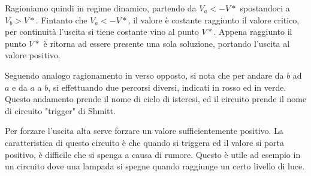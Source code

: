 \documentclass[../template]{subfiles}
\begin{document}
Ragioniamo quindi in regime dinamico, partendo da $V_a < -V*$ spostandoci a $V_b > V*$. Fintanto che $V_a < -V*$, il valore è costante raggiunto il valore critico, per continuità l'uscita si tiene costante vino al punto $V*$. Appena raggiunto il punto $V*$ è ritorna ad essere presente una sola soluzione, portando l'uscita al valore positivo.

\begin{center}
    \centering
\end{center}

Seguendo analogo ragionamento in verso opposto, si nota che per andare da $b$ ad $a$ e da $a$ a $b$, si effettuando due percorsi diversi, indicati in rosso ed in verde. Questo andamento prende il nome di ciclo di isteresi, ed il circuito prende il nome di circuito "trigger" di Shmitt.

Per forzare l'uscita alta serve forzare un valore sufficientemente positivo. La caratteristica di questo circuito è che quando si triggera ed il valore si porta positivo, è difficile che si spenga a causa di rumore. Questo è utile ad esempio in un circuito dove una lampada si spegne quando raggiunge un certo livello di luce.
\end{document}
